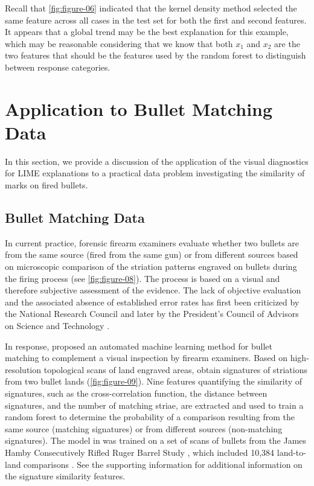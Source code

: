 \documentclass[AMS,STIX2COL]{WileyNJD-v2}\usepackage[]{graphicx}\usepackage[]{color}
\begin{document}
Recall that \autoref{fig:figure-06} indicated that the kernel density method selected the same feature across all cases in the test set for both the first and second features. It appears that a global trend may be the best explanation for this example, which may be reasonable considering that we know that both $x_1$ and $x_2$ are the two features that should be the features used by the random forest to distinguish between response categories.

\section{Application to Bullet Matching Data} \label{application}

In this section, we provide a discussion of the application of the visual diagnostics for LIME explanations to a practical data problem investigating the similarity of marks on fired bullets.

\subsection{Bullet Matching Data}







In current practice, forensic firearm examiners evaluate whether two bullets are from the same source (fired from the same gun) or from different sources based on microscopic comparison of the striation patterns engraved on bullets during the firing process (see \autoref{fig:figure-08}). The process is based on a visual and therefore subjective assessment of the evidence. The lack of objective evaluation and the associated absence of established error rates has first been criticized by the National Research Council \cite{nrc:2009} and later by the President's Council of Advisors on Science and Technology \cite{pcast:2016}.

In response, \citet{hare:2017} proposed an automated machine learning method for bullet matching to complement a visual inspection by firearm examiners. Based on high-resolution topological scans of land engraved areas, \citet{hare:2017} obtain signatures of striations from two bullet lands (\autoref{fig:figure-09}). Nine features quantifying the similarity of signatures, such as the cross-correlation function, the distance between signatures, and the number of matching striae, are extracted and used to train a random forest to determine the probability of a comparison resulting from the same source (matching signatures) or from different sources (non-matching signatures). The model in \citet{hare:2017} was trained on a set of scans of bullets from the James Hamby Consecutively Rifled Ruger Barrel Study \citep{hamby:2009}, which included 10,384 land-to-land comparisons \citet{hare:2017}. See the supporting information for additional information on the signature similarity features.
\end{document}
